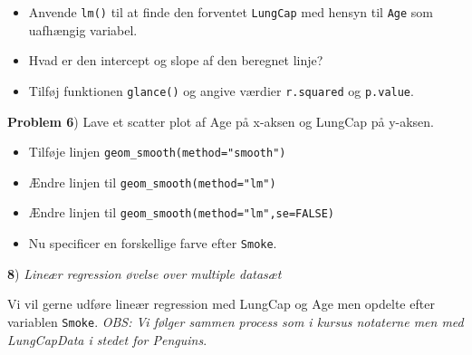 \documentclass[
]{book}
\newenvironment{Shaded}{\begin{snugshade}}{\end{snugshade}}
\newcommand{\AttributeTok}[1]{\textcolor[rgb]{0.77,0.63,0.00}{#1}}
\newcommand{\ConstantTok}[1]{\textcolor[rgb]{0.00,0.00,0.00}{#1}}
\newcommand{\DecValTok}[1]{\textcolor[rgb]{0.00,0.00,0.81}{#1}}
\newcommand{\FunctionTok}[1]{\textcolor[rgb]{0.00,0.00,0.00}{#1}}
\newcommand{\NormalTok}[1]{#1}
\newcommand{\OtherTok}[1]{\textcolor[rgb]{0.56,0.35,0.01}{#1}}
\newcommand{\SpecialCharTok}[1]{\textcolor[rgb]{0.00,0.00,0.00}{#1}}
\newcommand{\StringTok}[1]{\textcolor[rgb]{0.31,0.60,0.02}{#1}}
\providecommand{\tightlist}{%
  \setlength{\itemsep}{0pt}\setlength{\parskip}{0pt}}
\begin{document}
\begin{Shaded}
\end{Shaded}

\begin{itemize}
\item
  Anvende \texttt{lm()} til at finde den forventet \texttt{LungCap} med hensyn til \texttt{Age} som uafhængig variabel.
\item
  Hvad er den intercept og slope af den beregnet linje?
\item
  Tilføj funktionen \texttt{glance()} og angive værdier \texttt{r.squared} og \texttt{p.value}.
\end{itemize}

\textbf{Problem 6}) Lave et scatter plot af Age på x-aksen og LungCap på y-aksen.

\begin{itemize}
\tightlist
\item
  Tilføje linjen \texttt{geom\_smooth(method="smooth")}
\item
  Ændre linjen til \texttt{geom\_smooth(method="lm")}
\item
  Ændre linjen til \texttt{geom\_smooth(method="lm",se=FALSE)}
\item
  Nu specificer en forskellige farve efter \texttt{Smoke}.
\end{itemize}

\textbf{8}) \emph{Lineær regression øvelse over multiple datasæt}

Vi vil gerne udføre lineær regression med LungCap og Age men opdelte efter variablen \texttt{Smoke}. \emph{OBS: Vi følger sammen process som i kursus notaterne men med LungCapData i stedet for Penguins}.
\end{document}
